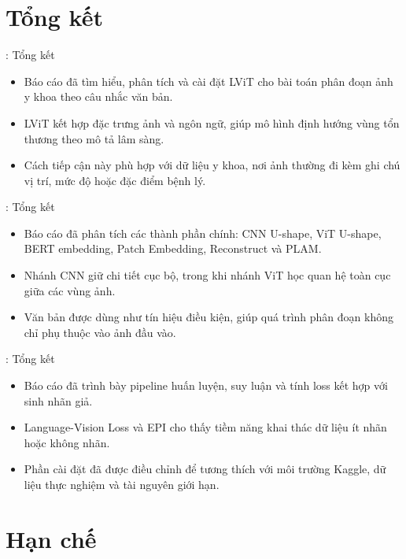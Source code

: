 \section{Tổng kết}

\begin{frame}{\secname: Tổng kết}
\begin{itemize}
    \item Báo cáo đã tìm hiểu, phân tích và cài đặt LViT cho bài toán phân đoạn ảnh y khoa theo câu nhắc văn bản.
    \item LViT kết hợp đặc trưng ảnh và ngôn ngữ, giúp mô hình định hướng vùng tổn thương theo mô tả lâm sàng.
    \item Cách tiếp cận này phù hợp với dữ liệu y khoa, nơi ảnh thường đi kèm ghi chú vị trí, mức độ hoặc đặc điểm bệnh lý.
\end{itemize}
\end{frame}

\begin{frame}{\secname: Tổng kết}
\begin{itemize}
    \item Báo cáo đã phân tích các thành phần chính: CNN U-shape, ViT U-shape, BERT embedding, Patch Embedding, Reconstruct và PLAM.
    \item Nhánh CNN giữ chi tiết cục bộ, trong khi nhánh ViT học quan hệ toàn cục giữa các vùng ảnh.
    \item Văn bản được dùng như tín hiệu điều kiện, giúp quá trình phân đoạn không chỉ phụ thuộc vào ảnh đầu vào.
\end{itemize}
\end{frame}

\begin{frame}{\secname: Tổng kết}
\begin{itemize}
    \item Báo cáo đã trình bày pipeline huấn luyện, suy luận và tính loss kết hợp với sinh nhãn giả.
    \item Language-Vision Loss và EPI cho thấy tiềm năng khai thác dữ liệu ít nhãn hoặc không nhãn.
    \item Phần cài đặt đã được điều chỉnh để tương thích với môi trường Kaggle, dữ liệu thực nghiệm và tài nguyên giới hạn.
\end{itemize}
\end{frame}

\section{Hạn chế}

